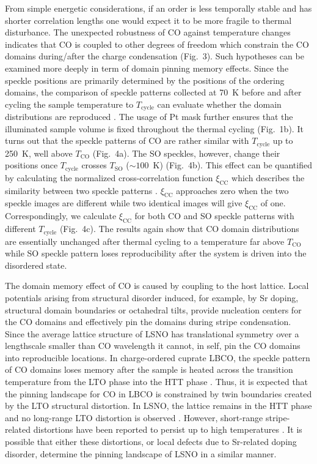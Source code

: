 \documentclass[aps,prl,showpacs,floatfix,twocolumn,superscriptaddress,longbibliography]{revtex4-1}
\def\TCO{\ensuremath{T_{\mathrm{CO}}}}
\def\TSO{\ensuremath{T_{\mathrm{SO}}}}
\def\TC{\ensuremath{T_{\mathrm{cycle}}}}
\begin{document}
From simple energetic considerations, if an order is less temporally stable and has shorter correlation lengths one would expect it to be more fragile to thermal disturbance. The unexpected robustness of \gls{CO} against temperature changes indicates that \gls{CO} is coupled to other degrees of freedom which constrain the \gls{CO} domains during/after the charge condensation (Fig.~3). Such hypotheses can be examined more deeply in term of domain pinning memory effects. Since the speckle positions are primarily determined by the positions of the ordering domains, the comparison of speckle patterns collected at 70~K before and after cycling the sample temperature to {\TC} can evaluate whether the domain distributions are reproduced \cite{Chen2019LBCO}. The usage of Pt mask further ensures that the illuminated sample volume is fixed throughout the thermal cycling (Fig.~1b). It turns out that the speckle patterns of \gls{CO} are rather similar with {\TC} up to 250~K, well above {\TCO} (Fig.~4a). The \gls{SO} speckles, however, change their positions once {\TC} crosses {\TSO} ($\sim 100$~K) (Fig.~4b). This effect can be quantified by calculating the normalized cross-correlation function $\xi_{\mathrm{CC}}$ which describes the similarity between two speckle patterns \cite{Chen2019LBCO, supp}. $\xi_{\mathrm{CC}}$ approaches zero when the two speckle images are different while two identical images will give $\xi_{\mathrm{CC}}$ of one. Correspondingly, we calculate $\xi_{\mathrm{CC}}$ for both \gls{CO} and \gls{SO} speckle patterns with different {\TC} (Fig.~4c). The results again show that \gls{CO} domain distributions are essentially unchanged after thermal cycling to a temperature far above {\TCO} while \gls{SO} speckle pattern loses reproducibility after the system is driven into the disordered state.


The domain memory effect of \gls{CO} is caused by coupling to the host lattice. Local potentials arising from structural disorder induced, for example, by Sr doping, structural domain boundaries or octahedral tilts, provide nucleation centers for the \gls{CO} domains and effectively pin the domains during stripe condensation. Since the average lattice structure of \gls{LSNO} has translational symmetry over a lengthscale smaller than \gls{CO} wavelength it cannot, in self, pin the \gls{CO} domains into reproducible locations. In charge-ordered cuprate \gls{LBCO}, the speckle pattern of \gls{CO} domains loses memory after the sample is heated across the transition temperature from the \gls{LTO} phase into the \gls{HTT} phase \cite{Chen2019LBCO}. Thus, it is expected that the pinning landscape for \gls{CO} in \gls{LBCO} is constrained by twin boundaries created by the \gls{LTO} structural distortion. In \gls{LSNO}, the lattice remains in the \gls{HTT} phase and no long-range \gls{LTO} distortion is observed \cite{Hucker2004PhaseDiagram}. However, short-range stripe-related distortions have been reported to persist up to high temperatures \cite{Simon2013LSNO}. It is possible that either these distortions, or local defects due to Sr-related doping disorder, determine the pinning landscape of \gls{LSNO} in a similar manner.
\end{document}
